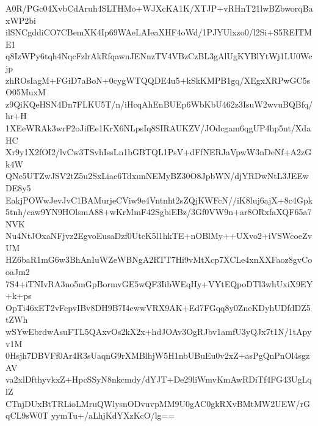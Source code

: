 A0R/PGc04XvbCdAruh4SLTHMo+WJXcKA1K/XTJP+vRHnT21lwBZbworqBaxWP2bi
ilSNCgddiCO7CBemXK4Ip69WAeLAIeaXHF4oWd/1PJYUlxzo0/l2Si+S5REITME1
q8IzWPy6tqh4NqcFzlrAkRfqawnJENnzTV4VBzCzBL3gAlUgKYBlYtWj1LU0Wcjp
zhROsIagM+FGiD7aBoN+0cygWTQQDE4u5+kSkKMPB1gq/XEgxXRPwGC5sO05MuxM
z9QiKQeHSN4Dn7FLKU5T/n/iHcqAhEnBUEp6WbKbU462z3IsuW2wvuBQBfq/hr+H
1XEeWRAk3wrF2oJifEe1KrX6NLpsIq8SIRAUKZV/JOdcgam6qgUP4hp5nt/XdaHC
Xr9y1X2fOI2/lvCw3TSvhIssLn1bGBTQL1PsV+dFfNERJaVpwW3nDeNf+A2zGk4W
QNc5UTZwJSV2tZ5u2SxLiae6TdxunNEMyBZ30O8JpbWN/djYRDwNtL3JEEwDE8y5
EakjPOWwJevJvC1BAMurjeCViw9e4Vntnht2sZQjKWFcN//iK8luj6ajX+8c4Gpk
5tnh/caw9YN9HOlsmA88+wKrMmF42SgbiEBz/3Gf0VW9n+ar8ORxfaXQF65a7NVK
Nu4NtJOxaNFjvz2EgvoEusaDzf0UtcK5l1hkTE+nOBlMy++UXvo2+iVSWcoeZvUM
HZ6baR1mG6w3BhAnIuWZeWBNgA2RTT7Hi9vMtXcp7XCLe4xnXXFaoz8gvCooaJm2
7S4+iTNIvRA3no5mGpBormvGE5wQF3IibWEqHy+VYtEQpoDTl3whUxiX9EY+k+ps
OpTi46xET2vFcpvIBv8DH9B7I4ewwVRX9AK+Ed7FGqq8y0ZneKDyhUDfdDZ5tZWh
wSYwEbrdwAsuFTL5QAxvOs2kX2x+hdJOAv3OgRJbv1amfU3yQJx7t1N/1tApyv1M
0Hsjh7DBVFf0Ar4R3sUaqnG9rXMBlhjW5H1nbUBuEu0v2xZ+asPgQnPnOl4sgzAV
va2xlDfthyvkxZ+HpcSSyN8nkcmdy/dYJT+De29liWmvKmAwRDiTf4FG43UgLqlZ
CTnjDUxBtTRLioLMruQWlysnODvuvpMM9U0gAC0gkRXvBMtMW2UEW/rGqCL9sW0T
yymTu+/aLhjKdYXzKcO/lg==
